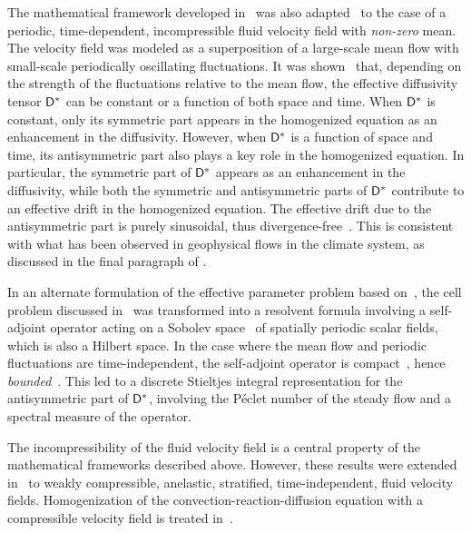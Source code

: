 \documentclass[amsa]{ipart}
\begin{document}
The mathematical framework developed in~\cite{McLaughlin:SIAM_JAM:780}
was also
adapted~\cite{Pavliotis:PHD_Thesis,Majda:Kramer:1999:book} 
to the case of a periodic, 
time-dependent, incompressible fluid velocity field with \emph{non-zero}
mean. The velocity field was modeled as a superposition of a
large-scale mean flow with small-scale periodically oscillating 
fluctuations. It was shown~\cite{Pavliotis:PHD_Thesis} that, depending
on the strength of the fluctuations relative to the mean flow, the
effective diffusivity tensor $\mathsf{D}^*$ can be constant or a function of
both space and time. When $\mathsf{D}^*$ is
constant, only its symmetric part 
appears in the homogenized equation as an enhancement in the
diffusivity. However, when $\mathsf{D}^*$ is a function of space and time,
its antisymmetric part also plays a key role in the homogenized
equation. In particular, the symmetric part of $\mathsf{D}^*$ appears as an
enhancement in the diffusivity, while both the symmetric and
antisymmetric parts of $\mathsf{D}^*$ contribute to an effective drift in the
homogenized equation. The effective drift due to the antisymmetric
part is purely sinusoidal, thus
divergence-free~\cite{Pavliotis:PHD_Thesis}. This is consistent with
what has been observed in geophysical flows in the climate system, as
discussed in the final paragraph of
. 


In an alternate formulation of the effective parameter problem based  
on~\cite{Bhattacharya:AAP:1999:951}, the cell problem discussed 
in~\cite{Pavliotis:PHD_Thesis} was transformed into a resolvent formula
involving a self-adjoint operator acting on a Sobolev
space~\cite{McOwen:2003:PDE,Folland:95:PDEs} of spatially periodic scalar
fields, which is also a Hilbert space. In the case where the mean flow
and periodic fluctuations are time-independent, the
self-adjoint operator is compact~\cite{Bhattacharya:AAP:1999:951},
hence \emph{bounded}~\cite{Stakgold:BVP:2000}. This led to a
discrete Stieltjes integral representation for the
antisymmetric part of $\mathsf{D}^*$, involving the P{\'e}clet number of the
steady flow and a spectral measure of the operator.    



The incompressibility of the fluid velocity field is a central
property of the mathematical frameworks described above. However, 
these results were extended in~\cite{McLaughlin:Forest:PF:1999:880}
to weakly compressible, anelastic, stratified, time-independent,
fluid velocity fields. Homogenization of the
convection-reaction-diffusion equation with a compressible velocity
field is treated in~\cite{Papanicolaou:1995:Diff_Rand_Media}. 
\end{document}
